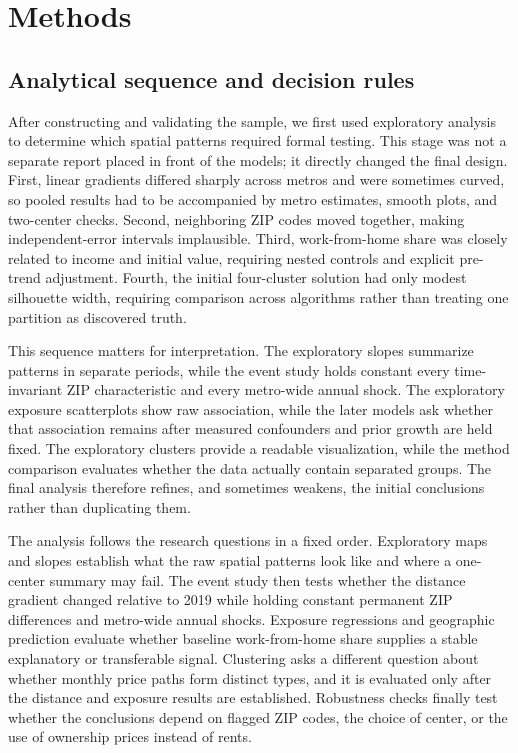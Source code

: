 \documentclass[11pt]{article}
\begin{document}
\section{Methods}

\subsection{Analytical sequence and decision rules}

After constructing and validating the sample, we first used exploratory analysis to determine which spatial patterns required
formal testing. This stage was not a separate report placed in front of the models; it directly changed the final design. First,
linear gradients differed sharply across metros and were sometimes curved, so pooled results had to
be accompanied by metro estimates, smooth plots, and two-center checks. Second, neighboring ZIP codes moved together, making
independent-error intervals implausible. Third, work-from-home share was closely related to income and initial value, requiring
nested controls and explicit pre-trend adjustment. Fourth, the initial four-cluster solution had only modest silhouette width,
requiring comparison across algorithms rather than treating one partition as discovered truth.

This sequence matters for interpretation. The exploratory slopes summarize patterns in separate periods, while the event study
holds constant every time-invariant ZIP characteristic and every metro-wide annual shock. The exploratory exposure scatterplots
show raw association, while the later models ask whether that association remains after measured confounders and prior growth are
held fixed. The exploratory clusters provide a readable visualization, while the method comparison evaluates whether the data
actually contain separated groups. The final analysis therefore refines, and sometimes weakens, the initial conclusions rather
than duplicating them.

The analysis follows the research questions in a fixed order. Exploratory maps and slopes establish what the raw spatial patterns
look like and where a one-center summary may fail. The event study then tests whether the distance gradient changed relative to
2019 while holding constant permanent ZIP differences and metro-wide annual shocks. Exposure regressions and geographic
prediction evaluate whether baseline work-from-home share supplies a stable explanatory or transferable signal. Clustering asks a
different question about whether monthly price paths form distinct types, and it is evaluated only after the distance and exposure
results are established. Robustness checks finally test whether the conclusions depend on flagged ZIP codes, the choice of center,
or the use of ownership prices instead of rents.
\end{document}
